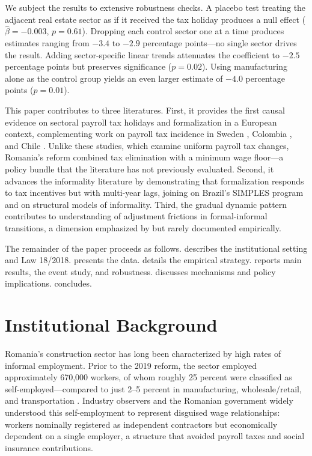 \documentclass[12pt]{article}
\begin{document}
We subject the results to extensive robustness checks. A placebo test treating the adjacent real estate sector as if it received the tax holiday produces a null effect ($\hat{\beta} = -0.003$, $p = 0.61$). Dropping each control sector one at a time produces estimates ranging from $-3.4$ to $-2.9$ percentage points---no single sector drives the result. Adding sector-specific linear trends attenuates the coefficient to $-2.5$ percentage points but preserves significance ($p = 0.02$). Using manufacturing alone as the control group yields an even larger estimate of $-4.0$ percentage points ($p = 0.01$).

This paper contributes to three literatures. First, it provides the first causal evidence on sectoral payroll tax holidays and formalization in a European context, complementing work on payroll tax incidence in Sweden \citep{saez2019payroll}, Colombia \citep{kugler2009effects}, and Chile \citep{gruber1997incidence}. Unlike these studies, which examine uniform payroll tax changes, Romania's reform combined tax elimination with a minimum wage floor---a policy bundle that the literature has not previously evaluated. Second, it advances the informality literature by demonstrating that formalization responds to tax incentives but with multi-year lags, joining \citet{monteiro2012coming} on Brazil's SIMPLES program and \citet{ulyssea2018firms} on structural models of informality. Third, the gradual dynamic pattern contributes to understanding of adjustment frictions in formal-informal transitions, a dimension emphasized by \citet{meghir2015wages} but rarely documented empirically.

The remainder of the paper proceeds as follows.  describes the institutional setting and Law 18/2018.  presents the data.  details the empirical strategy.  reports main results, the event study, and robustness.  discusses mechanisms and policy implications.  concludes.

\section{Institutional Background}
\label{sec:background}

Romania's construction sector has long been characterized by high rates of informal employment. Prior to the 2019 reform, the sector employed approximately 670,000 workers, of whom roughly 25 percent were classified as self-employed---compared to just 2--5 percent in manufacturing, wholesale/retail, and transportation \citep{eurostat2023nama}. Industry observers and the Romanian government widely understood this self-employment to represent disguised wage relationships: workers nominally registered as independent contractors but economically dependent on a single employer, a structure that avoided payroll taxes and social insurance contributions.
\end{document}
